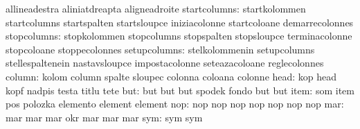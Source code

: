                                   allineadestra                    aliniatdreapta
                                  aligneadroite
                    startcolumns: startkolommen                    startcolumns
                                  startspalten                     startsloupce
                                  iniziacolonne                    startcoloane
                                  demarrecolonnes
                     stopcolumns: stopkolommen                     stopcolumns
                                  stopspalten                      stopsloupce
                                  terminacolonne                   stopcoloane
                                  stoppecolonnes
                    setupcolumns: stelkolommenin                   setupcolumns
                                  stellespaltenein                 nastavsloupce
                                  impostacolonne                   seteazacoloane
                                  reglecolonnes
                          column: kolom                            column
                                  spalte                           sloupec
                                  colonna                          coloana
                                  colonne
                            head: kop                              head
                                  kopf                             nadpis
                                  testa                            titlu
                                  tete
                             but: but                              but
                                  but                              spodek
                                  fondo                            but
                                  but
                            item: som                              item
                                  pos                              polozka
                                  elemento                         element
                                  element
                             nop: nop                              nop
                                  nop                              nop
                                  nop                              nop
                                  nop
                             mar: mar                              mar
                                  mar                              okr
                                  mar                              mar
                                  mar
                             sym: sym                              sym

